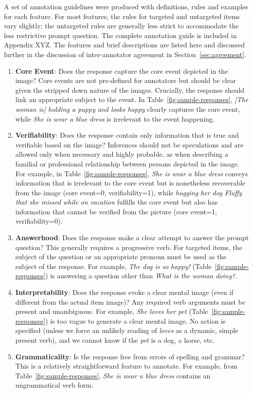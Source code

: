 A set of annotation guidelines were produced with definitions, rules and examples for each feature. For most features, the rules for targeted and untargeted items vary slightly; the untargeted rules are generally less strict to accommodate the less restrictive prompt question. The complete annotation guide is included in Appendix XYZ. The features and brief descriptions are listed here and discussed further in the discussion of inter-annotator agreement in Section~\ref{sec:agreement}.

\begin{enumerate}
\item \textbf{Core Event}: Does the response capture the core event depicted in the image? Core events are not pre-defined for annotators but should be clear given the stripped down nature of the images. Crucially, the response should link an appropriate subject to the event.  In Table~\ref{fig:sample-responses}, \textit{[The woman is] holding a puppy and looks happy} clearly captures the core event, while \textit{She is wear a blue dress} is irrelevant to the event happening.
\item \textbf{Verifiability}: Does the response contain only information that is true and verifiable based on the image? Inferences should not be speculations and are allowed only when necessary and highly probable, as when describing a familial or professional relationship between persons depicted in the image.  For example, in Table~\ref{fig:sample-responses}, \textit{She is wear a blue dress} conveys information that is irrelevant to the core event but is nonetheless recoverable from the image (core event=0, verifiability=1), while \textit{hugging her dog Fluffy that she missed while on vacation} fulfills the core event but also has information that cannot be verified from the picture (core event=1, verifiability=0).
\item \textbf{Answerhood}: Does the response make a clear attempt to answer the prompt question? This generally requires a progressive verb. For targeted items, the subject of the question or an appropriate pronoun must be used as the subject of the response.  For example, \textit{The dog is so happy!} (Table~\ref{fig:sample-responses}) is answering a question other than \textit{What is the woman doing?}. 
\item \textbf{Interpretability}: Does the response evoke a clear mental image (even if different from the actual item image)? Any required verb arguments must be present and unambiguous.  For example, \textit{She loves her pet} (Table~\ref{fig:sample-responses}) is too vague to generate a clear mental image. No action is specified (unless we force an unlikely reading of \textit{loves} as a dynamic, simple present verb), and we cannot know if the \textit{pet} is a dog, a horse, etc.
\item \textbf{Grammaticality}: Is the response free from errors of spelling and grammar?  
This is a relatively straightforward feature to annotate. For example, from Table~\ref{fig:sample-responses}, \textit{She is wear a blue dress} contains an ungrammatical verb form.

\end{enumerate}

